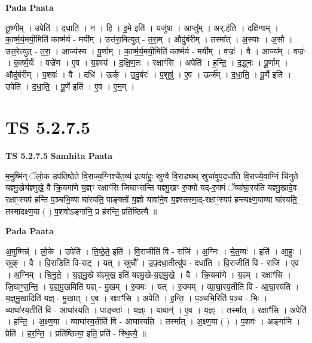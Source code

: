 \documentclass[17pt]{extarticle}
\begin{document}
\textbf{Pada Paata} \newline

तू॒ष्णीम् । उपेति॑ । द॒धा॒ति॒ । न । हि । इ॒मे इति॑ । यजु॑षा । आप्तु᳚म् । अर्.ह॑ति । दक्षि॑णाम् । का॒र्ष्म॒र्य॒मयी॒मिति॑ कार्ष्मर्य - मयी᳚म् । उत्त॑रा॒मित्युत् - त॒रा॒म् । औदु॑बंरीम् । तस्मा᳚त् । अ॒स्याः । अ॒सौ । उत्त॒रेत्युत् - त॒रा॒ । आज्य॑स्य । पू॒र्णाम् । का॒र्ष्म॒र्य॒मयी॒मिति॑ कार्ष्मर्य - मयी᳚म् । वज्रः॑ । वै । आज्य᳚म् । वज्रः॑ । का॒र्ष्म॒र्यः॑ । वज्रे॑ण । ए॒व । य॒ज्ञ्स्य॑ । द॒क्षि॒ण॒तः । रक्षाꣳ॑सि । अपेति॑ । ह॒न्ति॒ । द॒द्ध्नः । पू॒र्णाम् । औदु॑बंरीम् । प॒शवः॑ । वै । दधि॑ । ऊर्क् । उ॒दु॒बंरः॑ । प॒शुषु॑ । ए॒व । ऊर्ज᳚म् । द॒धा॒ति॒ । पू॒र्णे इति॑ । उपेति॑ । द॒धा॒ति॒ । पू॒र्णे इति॑ । ए॒व । ए॒न॒म् ।  \newline





\section{ TS 5.2.7.5 }

\textbf{TS 5.2.7.5 } \newline
\textbf{Samhita Paata} \newline

म॒मुष्मि॑न् ॅलो॒क उप॑तिष्ठेते वि॒राज्य॒ग्निश्चे॑त॒व्य॑ इत्या॑हुः॒ स्रुग्वै वि॒राड्यथ् स्रुचा॑वुप॒दधा॑ति वि॒राज्ये॒वाग्निं चि॑नुते यज्ञ्मु॒खेय॑ज्ञ्मुखे॒ वै क्रि॒यमा॑णे य॒ज्ञ्ꣳ रक्षाꣳ॑सि जिघाꣳसन्ति यज्ञ्मु॒खꣳ रु॒क्मो यद्-रु॒क्मं ॅव्या॑घा॒रय॑ति यज्ञ्मु॒खादे॒व रक्षाꣳ॒॒स्यप॑ हन्ति प॒ञ्चभि॒व्या घा॑रयति॒ पाङ्क्तो॑ य॒ज्ञो यावा॑ने॒व य॒ज्ञ्स्तस्मा॒द्-रक्षाꣳ॒॒स्यप॑ हन्त्यक्ष्ण॒याव्या घा॑रयति॒ तस्मा॑दक्ष्ण॒या ( ) प॒शवोऽङ्गा॑नि॒ प्र ह॑रन्ति॒ प्रति॑ष्ठित्यै ॥ \newline

\textbf{Pada Paata} \newline

अ॒मुष्मिन्न्॑ । लो॒के । उपेति॑ । ति॒ष्ठे॒ते॒ इति॑ । वि॒राजीति॑ वि - राजि॑ । अ॒ग्निः । चे॒त॒व्यः॑ । इति॑ । आ॒हुः॒ । स्रुक् । वै । वि॒राडिति॑ वि-राट् । यत् । स्रुचौ᳚ । उ॒प॒दधा॒तीत्यु॑प - दधा॑ति । वि॒राजीति॑ वि - राजि॑ । ए॒व । अ॒ग्निम् । चि॒नु॒ते॒ । य॒ज्ञ्॒मु॒खे य॑ज्ञ्मुख॒ इति॑ यज्ञ्मु॒खे-य॒ज्ञ्॒मु॒खे॒ । वै । क्रि॒यमा॑णे । य॒ज्ञ्म् । रक्षाꣳ॑सि । जि॒घाꣳ॒॒स॒न्ति॒ । य॒ज्ञ्॒मु॒खमिति॑ यज्ञ् - मु॒खम् । रु॒क्मः । यत् । रु॒क्मम् । व्या॒घा॒रय॒तीति॑ वि - आ॒घा॒रय॑ति । य॒ज्ञ्॒मु॒खादिति॑ यज्ञ् - मु॒खात् । ए॒व । रक्षाꣳ॑सि । अपेति॑ । ह॒न्ति॒ । प॒ञ्चभि॒रिति॑ प॒ञ्च - भिः॒ । व्याघा॑रय॒तीति॑ वि - आघा॑रयति । पाङ्क्तः॑ । य॒ज्ञ्ः । यावान्॑ । ए॒व । य॒ज्ञ्ः । तस्मा᳚त् । रक्षाꣳ॑सि । अपेति॑ । ह॒न्ति॒ । अ॒क्ष्ण॒या । व्याघा॑रय॒तीति॑ वि - आघा॑रयति । तस्मा᳚त् । अ॒क्ष्ण॒या ( ) । प॒शवः॑ । अङ्गा॑नि । प्रेति॑ । ह॒र॒न्ति॒ । प्रति॑ष्ठित्या॒ इति॒ प्रति॑ - स्थि॒त्यै॒ ॥  \newline
\end{document}
